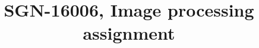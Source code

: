 \documentclass{article}
\title{SGN-16006, Image processing assignment}
\begin{document}
\maketitle
\sloppy







\small






\vfill\pagebreak
\end{document}
